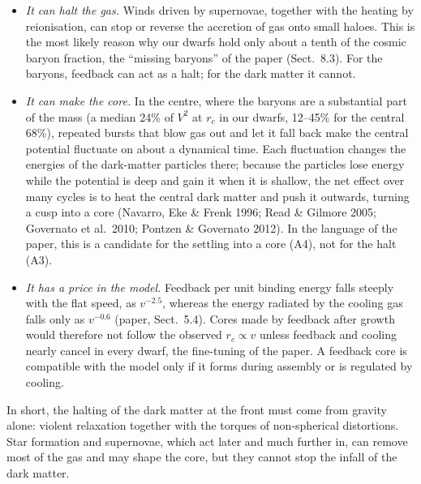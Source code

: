 \documentclass[11pt,a4paper]{article}
\begin{document}
\begin{itemize}
\item \emph{It can halt the gas.} Winds driven by supernovae, together with the
  heating by reionisation, can stop or reverse the accretion of gas onto small haloes.
  This is the most likely reason why our dwarfs hold only about a tenth of the cosmic
  baryon fraction, the ``missing baryons'' of the paper (Sect.~8.3). For the baryons,
  feedback can act as a halt; for the dark matter it cannot.
\item \emph{It can make the core.} In the centre, where the baryons are a substantial
  part of the mass (a median 24\% of $V^2$ at $r_c$ in our dwarfs, 12--45\% for the central 68\%), repeated bursts
  that blow gas out and let it fall back make the central potential fluctuate on about
  a dynamical time. Each fluctuation changes the energies of the dark-matter particles
  there; because the particles lose energy while the potential is deep and gain it when
  it is shallow, the net effect over many cycles is to heat the central dark matter and
  push it outwards, turning a cusp into a core (Navarro, Eke \& Frenk 1996; Read \&
  Gilmore 2005; Governato et al.\ 2010; Pontzen \& Governato 2012). In the language of
  the paper, this is a candidate for the settling into a core (A4), not for the halt
  (A3).
\item \emph{It has a price in the model.} Feedback per unit binding energy falls
  steeply with the flat speed, as $v^{-2.5}$, whereas the energy radiated by the
  cooling gas falls only as $v^{-0.6}$ (paper, Sect.~5.4). Cores made by feedback after
  growth would therefore not follow the observed $r_c\propto v$ unless feedback and
  cooling nearly cancel in every dwarf, the fine-tuning of the paper. A feedback core is
  compatible with the model only if it forms during assembly or is regulated by
  cooling.
\end{itemize}
In short, the halting of the dark matter at the front must come from gravity alone:
violent relaxation together with the torques of non-spherical distortions. Star
formation and supernovae, which act later and much further in, can remove most of the
gas and may shape the core, but they cannot stop the infall of the dark matter.
\end{document}
